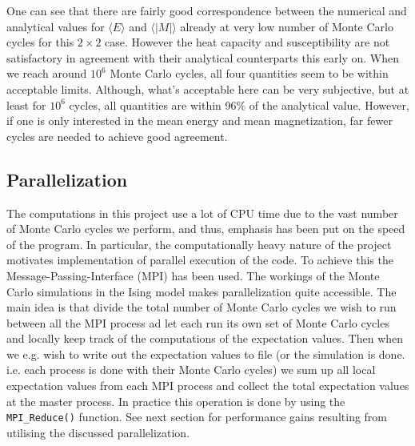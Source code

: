 \documentclass[12pt]{article}
\numberwithin{figure}{section}
\numberwithin{table}{section}
\begin{document}
\noindent One can see that there are fairly good correspondence between the numerical and analytical values for $\langle E \rangle$ and $\langle |M| \rangle$ already at very low number of Monte Carlo cycles for this $2\times2$ case. However the heat capacity and susceptibility are not satisfactory in agreement with their analytical counterparts this early on. When we reach around $10^6$ Monte Carlo cycles, all four quantities seem to be within acceptable limits. Although, what's acceptable here can be very subjective, but at least for $10^6$ cycles, all quantities are within 96\% of the analytical value. However, if one is only interested in the mean energy and mean magnetization, far fewer cycles are needed to achieve good agreement.

\subsection{Parallelization}
The computations in this project use a lot of CPU time due to the vast number of Monte Carlo cycles we perform, and thus, emphasis has been put on the speed of the program. In particular, the computationally heavy nature of the project motivates implementation of parallel execution of the code. To achieve this the Message-Passing-Interface (MPI) \cite{MPI} has been used. The workings of the Monte Carlo simulations in the Ising model makes parallelization quite accessible. The main idea is that divide the total number of Monte Carlo cycles we wish to run between all the MPI process ad let each run its own set of Monte Carlo cycles and locally keep track of the computations of the expectation values. Then when we e.g. wish to write out the expectation values to file (or the simulation is done. i.e. each process is done with their Monte Carlo cycles) we sum up all local expectation values from each MPI process and collect the total expectation values at the master process. In practice this operation is done by using the \texttt{MPI\_Reduce()} function. See next section for performance gains resulting from utilising the discussed parallelization.

\end{document}
